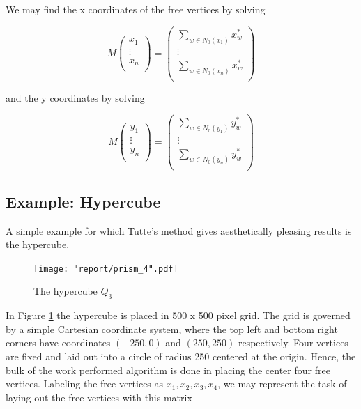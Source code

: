 \documentclass[11pt]{report}
\begin{document}
We may find the x coordinates of the free vertices by solving

\begin{equation}\label{eqn:barycenter_matrix_x}
    M \begin{pmatrix}
        x_1 \\ \vdots \\ x_n \\
    \end{pmatrix} =
    \begin{pmatrix}
        \sum_{w \in N_0(x_1)} x^*_w \\
        \vdots \\
        \sum_{w \in N_0(x_n)} x^*_w \\
    \end{pmatrix}
\end{equation}

and the y coordinates by solving

\begin{equation}\label{eqn:barycenter_matrix_y}
    M \begin{pmatrix}
       y_1 \\ \vdots \\ y_n \\
    \end{pmatrix} =
    \begin{pmatrix}
        \sum_{w \in N_0(y_1)} y^*_w \\
        \vdots \\
        \sum_{w \in N_0(y_n)} y^*_w \\
    \end{pmatrix}
\end{equation}

\subsection{Example: Hypercube}
A simple example for which Tutte's method gives aesthetically pleasing results is the hypercube.

\begin{figure}[H]\label{fig:hypercube}
    \centering
    \texttt{[image: "report/prism\_4".pdf]}
    \caption{The hypercube $Q_3$}
\end{figure}

In Figure \ref{fig:hypercube} the hypercube is placed in 500 x 500 pixel grid. The grid is governed by a simple Cartesian coordinate system, where the top left and bottom right corners have coordinates $(-250, 0)$ and $(250, 250)$ respectively. Four vertices are fixed and laid out into a circle of radius 250 centered at the origin. Hence, the bulk of the work performed algorithm is done in placing the center four free vertices. Labeling the free vertices as $x_1, x_2, x_3, x_4$, we may represent the task of laying out the free vertices with this matrix
\end{document}
